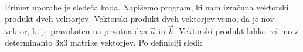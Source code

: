 \documentclass[a4paper, 12pt]{article}
\begin{document}
Primer uporabe  je sledeča koda. Napišemo program, ki nam izračuna vektorski produkt dveh vektorjev. Vektorski produkt dveh vektorjev vemo, da je nov vektor, ki je pravokoten na prvotna dva $\vec{a}$ in $\vec{b}$. Vektorski produkt lahko rešimo z determinanto 3x3 matrike vektorjev. Po definiciji sledi:\\

\end{document}
